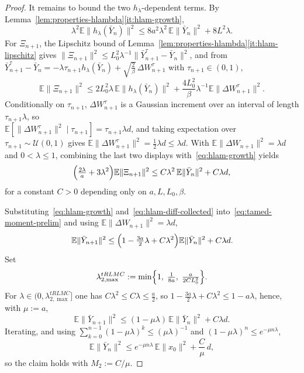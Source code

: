 \documentclass[11pt,a4paper,reqno]{amsart}
\theoremstyle{plain}
\theoremstyle{definition}
\theoremstyle{remark}
\newcommand{\E}{\mathbb{E}}
\begin{document}
\begin{proof}
It remains to bound the two $h_\lambda$-dependent terms. By
Lemma~\ref{lem:properties-hlambda}\ref{it:hlam-growth},
\begin{equation}\label{eq:hlam-growth}
  \lambda^2\E\|h_\lambda(\bar Y_n)\|^2
  \le
  8a^2\lambda^2\,\E\|\bar Y_n\|^2+8L^2\lambda .
\end{equation}
For $\Xi_{n+1}$, the Lipschitz bound of
Lemma~\ref{lem:properties-hlambda}\ref{it:hlam-lipschitz} gives
$\|\Xi_{n+1}\|^2\le L_0^2\lambda^{-1}\|\bar Y_{n+1}^{\tau}-\bar Y_n\|^2$, and from
$\bar Y_{n+1}^{\tau}-\bar Y_n
=-\lambda\tau_{n+1}h_\lambda(\bar Y_n)+\sqrt{\frac{2}{\beta}}\,\Delta W_{n+1}^{\tau}$ with
$\tau_{n+1}\in(0,1)$,
\[
  \E\|\Xi_{n+1}\|^2
  \le
  2L_0^2\lambda\,\E\|h_\lambda(\bar Y_n)\|^2
  +\frac{4L_0^2}{\beta}\lambda^{-1}\E\|\Delta W_{n+1}^{\tau}\|^2 .
\]
Conditionally on $\tau_{n+1}$, $\Delta W_{n+1}^{\tau}$ is a Gaussian increment
over an interval of length $\tau_{n+1}\lambda$, so \\
$\E[\|\Delta W_{n+1}^{\tau}\|^2\mid\tau_{n+1}]=\tau_{n+1}\lambda d$, and taking
expectation over $\tau_{n+1}\sim\mathcal U(0,1)$ gives
$\E\|\Delta W_{n+1}^{\tau}\|^2=\tfrac12\lambda d\le\lambda d$. With
$\E\|\Delta W_{n+1}\|^2=\lambda d$ and $0<\lambda\le1$, combining the last two
displays with~\eqref{eq:hlam-growth} yields
\begin{equation}\label{eq:hlam-diff-collected}
  \Bigl(\tfrac{2\lambda}{a}+3\lambda^2\Bigr)\E\|\Xi_{n+1}\|^2
  \le
  C\lambda^2\,\E\|\bar Y_n\|^2+C\lambda d ,
\end{equation}
for a constant $C>0$ depending only on $a,L,L_0,\beta$.

Substituting~\eqref{eq:hlam-growth} and~\eqref{eq:hlam-diff-collected}
into~\eqref{eq:tamed-moment-prelim} and using $\E\|\Delta W_{n+1}\|^2=\lambda d$,
\[
  \E\|\bar Y_{n+1}\|^2
  \le
  \Bigl(1-\tfrac{3a}{2}\lambda+C\lambda^2\Bigr)\E\|\bar Y_n\|^2
  +C\lambda d .
\]
Set
\[
  \lambda_{2,\max}^{tRLMC}
  :=\min\Bigl\{1,\;\tfrac{1}{8a},\;\tfrac{a}{2CL_0^2}\Bigr\}.
\]
For $\lambda\in(0,\lambda_{2,\max}^{tRLMC}]$ one has $C\lambda^2\le C\lambda\le
\tfrac{a}{2}$, so $1-\tfrac{3a}{2}\lambda+C\lambda^2\le 1-a\lambda$, hence,
with $\mu:=a$,
\[
  \E\|\bar Y_{n+1}\|^2
  \le
  (1-\mu\lambda)\,\E\|\bar Y_n\|^2+C\lambda d .
\]
Iterating, and using $\sum_{k=0}^{n-1}(1-\mu\lambda)^k\le(\mu\lambda)^{-1}$ and
$(1-\mu\lambda)^n\le e^{-\mu n\lambda}$,
\[
  \E\|\bar Y_n\|^2
  \le
  e^{-\mu n\lambda}\,\E\|x_0\|^2+\frac{C}{\mu}\,d ,
\]
so the claim holds with $M_2:=C/\mu$.
\end{proof}
\end{document}

